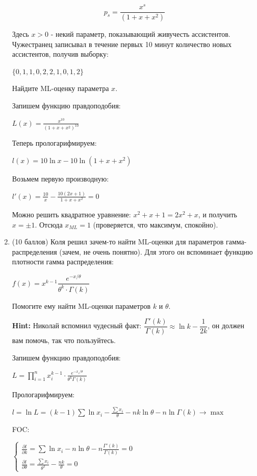 \documentclass[12pt]{article}
\newenvironment{solution}{}{}
\begin{document}
\begin{enumerate}
    \[p_s = \frac{x^s}{(1 + x + x^2)}\]
    
    Здесь $x > 0$ - некий параметр, показывающий живучесть ассистентов. Чужестранец записывал в течение первых 10 минут количество новых ассистентов, получив выборку:
    
    $\{0, 1, 1, 0, 2, 2, 1, 0, 1, 2\}$
    
    Найдите ML-оценку параметра $x$.
    
\begin{solution}
    Запишем функцию правдоподобия:
    
    $L(x) = \frac{x^{10}}{(1 + x + x^2)^{10}}$
    
    Теперь прологарифмируем:
    
    $l(x) = 10\ln{x} - 10\ln{(1 + x + x^2)}$
    
    Возьмем первую производную:
    
    $l'(x) = \frac{10}{x} - \frac{10(2x + 1)}{1 + x + x^2} = 0$
    
    Можно решить квадратное уравнение: $x^2 + x + 1 = 2x^2 + x$, и получить $x = \pm 1$. Отсюда $x_{ML} = 1$ (проверяется, что максимум, спокойно).
\end{solution}

    \item (10 баллов) Коля решил зачем-то найти ML-оценки для параметров гамма-распределения (зачем, не очень понятно). Для этого он вспоминает функцию плотности гамма распределения:
    
    $f(x) = x^{k - 1} \dfrac{e^{-x / \theta}}{\theta^k \cdot \Gamma{(k)}}$
    
    Помогите ему найти ML-оценки параметров $k$ и $\theta$.
    
    \textbf{Hint:} Николай вспомнил чудесный факт: $\dfrac{\Gamma'{(k)}}{\Gamma{(k)}} \approx \ln{k} - \dfrac{1}{2k}$, он должен вам помочь, так что пользуйтесь.
    
\begin{solution}
  Запишем функцию правдоподобия:
  
  $L = \prod_{i = 1}^n x_i^{k - 1} \cdot \frac{e^{-x_i / \theta}}{\theta^k \Gamma(k)}$
  
  Прологарифмируем:
  
  $l = \ln{L} = (k - 1) \sum \ln{x_i} - \frac{\sum x_i}{\theta} - nk \ln{\theta} - n \ln{\Gamma(k)} \rightarrow \max$
  
  FOC:
  
  $\begin{cases}
  \frac{\partial l}{\partial k} = \sum \ln{x_i} - n\ln{\theta} - n \frac{\Gamma'{(k)}}{\Gamma{(k)}} = 0 \\
  \frac{\partial l}{\partial \theta} = \frac{\sum x_i}{\theta^2} - \frac{nk}{\theta} = 0
  \end{cases}$
  

\end{solution}
\end{enumerate}
\end{document}
